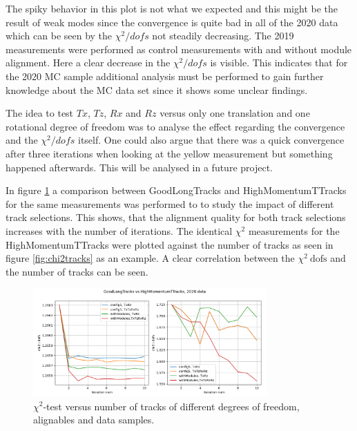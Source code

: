 The spiky behavior in this plot is not what we expected and this might be the result of weak modes since the convergence is quite bad in all of the 2020 data which can be seen by the $\chi^2 / dofs$ not steadily decreasing.
The 2019 measurements were performed as control measurements with and without
module alignment. Here a clear decrease in the $\chi^2 / dofs$ is visible. This
indicates that for the 2020 MC sample additional analysis must be performed to gain further knowledge about the MC data set since it shows some unclear findings.

The idea to test $Tx$, $Tz$, $Rx$ and $Rz$ versus only one translation and one
rotational degree of freedom was to analyse the effect regarding the convergence and the $\chi^2 / dofs$ itself. One could also argue that there was a quick convergence after three iterations when looking at the yellow measurement but something happened afterwards. This will be analysed in a future project.

In figure \ref{fig:chi2iter} a comparison between GoodLongTracks and HighMomentumTTracks for the same measurements was performed to to study the impact of different track selections. This shows, that the alignment quality for both track selections increases with the number of iterations.
The identical $\chi^2$ measurements for the HighMomentumTTracks were plotted against the number of tracks as seen in figure \ref{fig:chi2tracks} as an example.
A clear correlation between the $\chi^2 \ \text{dofs}$ and the number of tracks can be seen.

\begin{figure}
  \centering
  \includegraphics[width=0.8\textwidth]{plots/GL_HM_chi2_2020.png}
  \caption{$\chi^2$-test versus number of tracks of different degrees of freedom, alignables and data samples.}
  \label{fig:chi2iter}
\end{figure}

